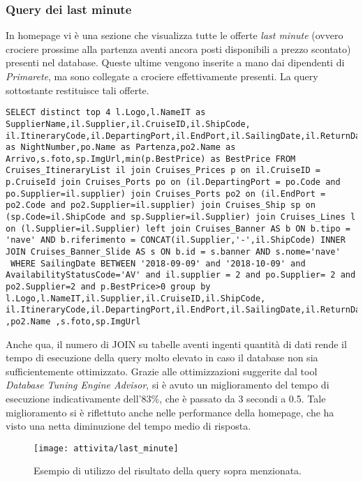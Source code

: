 \subsubsection{Query dei last minute}
In homepage vi è una sezione che visualizza tutte le offerte \textit{last minute} (ovvero crociere prossime alla partenza aventi ancora posti disponibili a prezzo scontato) presenti nel database. Queste ultime vengono inserite a mano dai dipendenti di \textit{Primarete}, ma sono collegate a crociere effettivamente presenti. La query sottostante restituisce tali offerte.
\begin{lstlisting}
SELECT distinct top 4 l.Logo,l.NameIT as SupplierName,il.Supplier,il.CruiseID,il.ShipCode, il.ItineraryCode,il.DepartingPort,il.EndPort,il.SailingDate,il.ReturnDate,il.SailingLengthDays as NightNumber,po.Name as Partenza,po2.Name as Arrivo,s.foto,sp.ImgUrl,min(p.BestPrice) as BestPrice FROM Cruises_ItineraryList il join Cruises_Prices p on il.CruiseID = p.CruiseId join Cruises_Ports po on (il.DepartingPort = po.Code and po.Supplier=il.supplier) join Cruises_Ports po2 on (il.EndPort = po2.Code and po2.Supplier=il.supplier) join Cruises_Ship sp on (sp.Code=il.ShipCode and sp.Supplier=il.Supplier) join Cruises_Lines l on (l.Supplier=il.Supplier) left join Cruises_Banner AS b ON b.tipo = 'nave' AND b.riferimento = CONCAT(il.Supplier,'-',il.ShipCode) INNER JOIN Cruises_Banner_Slide AS s ON b.id = s.banner AND s.nome='nave'
 WHERE SailingDate BETWEEN '2018-09-09' and '2018-10-09' and AvailabilityStatusCode='AV' and il.supplier = 2 and po.Supplier= 2 and po2.Supplier=2 and p.BestPrice>0 group by l.Logo,l.NameIT,il.Supplier,il.CruiseID,il.ShipCode, il.ItineraryCode,il.DepartingPort,il.EndPort,il.SailingDate,il.ReturnDate,il.SailingLengthDays,po.Name ,po2.Name ,s.foto,sp.ImgUrl
\end{lstlisting}
Anche qua, il numero di JOIN su tabelle aventi ingenti quantità di dati rende il tempo di esecuzione della query molto elevato in caso il database non sia sufficientemente ottimizzato. Grazie alle ottimizzazioni suggerite dal tool \textit{Database Tuning Engine Advisor}, si è avuto un miglioramento del tempo di esecuzione indicativamente dell'83\%, che è passato da 3 secondi a 0.5. Tale miglioramento si è riflettuto anche nelle performance della homepage, che ha visto una netta diminuzione del tempo medio di risposta.
\begin{figure}[!h] 
	\centering 
	\texttt{[image: attivita/last\_minute]} 
	\caption{Esempio di utilizzo del risultato della query sopra menzionata.}
\end{figure}

